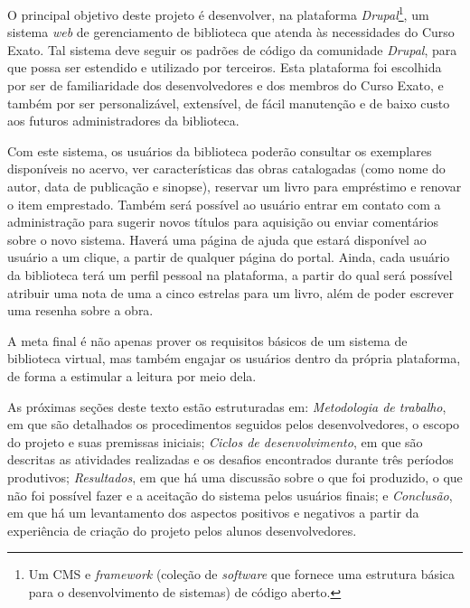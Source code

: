 \documentclass[a4paper]{article}
\begin{document}
O principal objetivo deste projeto é desenvolver, na plataforma \textit{Drupal}\footnote{Um CMS e \textit{framework} (coleção de \textit{software} que fornece uma estrutura básica para o desenvolvimento de sistemas) de código aberto.}, um sistema \textit{web} de gerenciamento de biblioteca que atenda às necessidades do Curso Exato. Tal sistema deve seguir os padrões de código da comunidade \textit{Drupal}, para que possa ser estendido e utilizado por terceiros. Esta plataforma foi escolhida por ser de familiaridade dos desenvolvedores e dos membros do Curso Exato, e também por ser personalizável, extensível, de fácil manutenção e de baixo custo aos futuros administradores da biblioteca.

Com este sistema, os usuários da biblioteca poderão consultar os exemplares disponíveis no acervo, ver características das obras catalogadas (como nome do autor, data de publicação e sinopse), reservar um livro para empréstimo e renovar o item emprestado. Também será possível ao usuário entrar em contato com a administração para sugerir novos títulos para aquisição ou enviar comentários sobre o novo sistema. Haverá uma página de ajuda que estará disponível ao usuário a um clique, a partir de qualquer página do portal. Ainda, cada usuário da biblioteca terá um perfil pessoal na plataforma, a partir do qual será possível atribuir uma nota de uma a cinco estrelas para um livro, além de poder escrever uma resenha sobre a obra.

A meta final é não apenas prover os requisitos básicos de um sistema de biblioteca virtual, mas também engajar os usuários dentro da própria plataforma, de forma a estimular a leitura por meio dela.

As próximas seções deste texto estão estruturadas em: \textit{Metodologia de trabalho}, em que são detalhados os procedimentos seguidos pelos desenvolvedores, o escopo do projeto e suas premissas iniciais; \textit{Ciclos de desenvolvimento}, em que são descritas as atividades realizadas e os desafios encontrados durante três períodos produtivos; \textit{Resultados}, em que há uma discussão sobre o que foi produzido, o que não foi possível fazer e a aceitação do sistema pelos usuários finais; e \textit{Conclusão}, em que há um levantamento dos aspectos positivos e negativos a partir da experiência de criação do projeto pelos alunos desenvolvedores.
\end{document}
